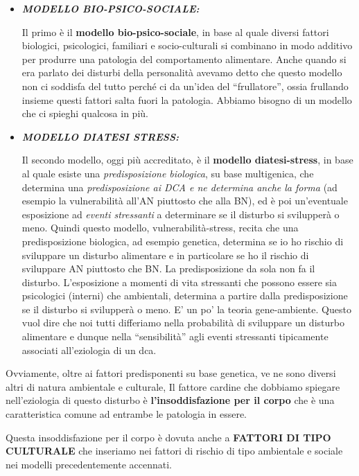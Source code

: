 \begin{itemize}
\item
  \textbf{\emph{MODELLO BIO-PSICO-SOCIALE:}}

  Il primo è il \textbf{modello bio-psico-sociale}, in base al quale
  diversi fattori biologici, psicologici, familiari e socio-culturali si
  combinano in modo additivo per produrre una patologia del
  comportamento alimentare. Anche quando si era parlato dei disturbi
  della personalità avevamo detto che questo modello non ci soddisfa del
  tutto perché ci da un'idea del ``frullatore'', ossia frullando insieme
  questi fattori salta fuori la patologia. Abbiamo bisogno di un modello
  che ci spieghi qualcosa in più.
\item
  \textbf{\emph{MODELLO DIATESI STRESS:}}

  Il secondo modello, oggi più accreditato, è il \textbf{modello
  diatesi-stress}, in base al quale esiste una \emph{predisposizione
  biologica}, su base multigenica, che determina una
  \emph{predisposizione ai DCA e ne determina anche la forma} (ad
  esempio la vulnerabilità all'AN piuttosto che alla BN), ed è poi
  un'eventuale esposizione ad \emph{eventi stressanti} a determinare se
  il disturbo si svilupperà o meno. Quindi questo modello,
  vulnerabilità-stress, recita che una predisposizione biologica, ad
  esempio genetica, determina se io ho rischio di sviluppare un disturbo
  alimentare e in particolare se ho il rischio di sviluppare AN
  piuttosto che BN. La predisposizione da sola non fa il disturbo.
  L'esposizione a momenti di vita stressanti che possono essere sia
  psicologici (interni) che ambientali, determina a partire dalla
  predisposizione se il disturbo si svilupperà o meno. E' un po' la
  teoria gene-ambiente. Questo vuol dire che noi tutti differiamo nella
  probabilità di sviluppare un disturbo alimentare e dunque nella
  ``sensibilità'' agli eventi stressanti tipicamente associati
  all'eziologia di un dca.
\end{itemize}

Ovviamente, oltre ai fattori predisponenti su base genetica, ve ne sono
diversi altri di natura ambientale e culturale, Il fattore cardine che
dobbiamo spiegare nell'eziologia di questo disturbo è
\textbf{l'insoddisfazione per il corpo} che è una caratteristica comune
ad entrambe le patologia in essere.

Questa insoddisfazione per il corpo è dovuta anche a \textbf{FATTORI DI
TIPO CULTURALE} che inseriamo nei fattori di rischio di tipo ambientale
e sociale nei modelli precedentemente accennati.

